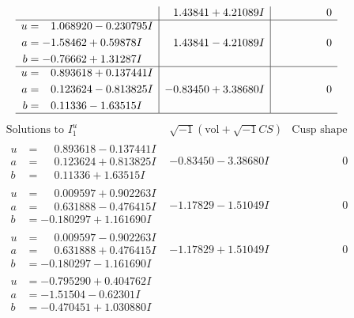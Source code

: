\documentclass[1p]{elsarticle_modified}
\theoremstyle{definition}
\newcommand{\I}{\sqrt{-1}}
\begin{document}
$$\begin{array}{c|c|c}
 & \phantom{-}1.43841 + 4.21089 I & \phantom{-0.000000 } 0 \\ \hline\begin{aligned}
u &= \phantom{-}1.068920 - 0.230795 I \\
a &= -1.58462 + 0.59878 I \\
b &= -0.76662 + 1.31287 I\end{aligned}
 & \phantom{-}1.43841 - 4.21089 I & \phantom{-0.000000 } 0 \\ \hline\begin{aligned}
u &= \phantom{-}0.893618 + 0.137441 I \\
a &= \phantom{-}0.123624 - 0.813825 I \\
b &= \phantom{-}0.11336 - 1.63515 I\end{aligned}
 & -0.83450 + 3.38680 I & \phantom{-0.000000 } 0\\
 \hline 
 \end{array}$$\newpage$$\begin{array}{c|c|c}  
\text{Solutions to }I^u_{1}& \I (\text{vol} + \sqrt{-1}CS) & \text{Cusp shape}\\
 \hline 
\begin{aligned}
u &= \phantom{-}0.893618 - 0.137441 I \\
a &= \phantom{-}0.123624 + 0.813825 I \\
b &= \phantom{-}0.11336 + 1.63515 I\end{aligned}
 & -0.83450 - 3.38680 I & \phantom{-0.000000 } 0 \\ \hline\begin{aligned}
u &= \phantom{-}0.009597 + 0.902263 I \\
a &= \phantom{-}0.631888 - 0.476415 I \\
b &= -0.180297 + 1.161690 I\end{aligned}
 & -1.17829 - 1.51049 I & \phantom{-0.000000 } 0 \\ \hline\begin{aligned}
u &= \phantom{-}0.009597 - 0.902263 I \\
a &= \phantom{-}0.631888 + 0.476415 I \\
b &= -0.180297 - 1.161690 I\end{aligned}
 & -1.17829 + 1.51049 I & \phantom{-0.000000 } 0 \\ \hline\begin{aligned}
u &= -0.795290 + 0.404762 I \\
a &= -1.51504 - 0.62301 I \\
b &= -0.470451 + 1.030880 I\end{aligned}

\end{array}$$
\end{document}
